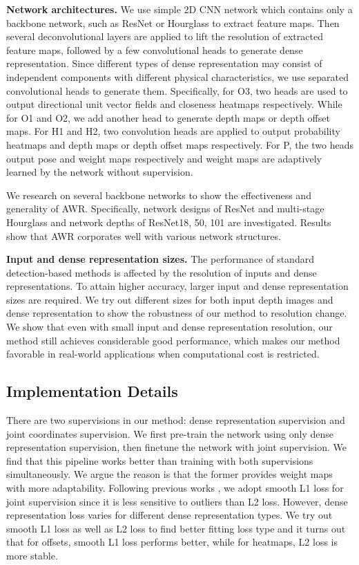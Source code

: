 \documentclass[letterpaper]{article} \usepackage{aaai20}  \usepackage{times}  \usepackage{helvet} \usepackage{courier}  \usepackage[hyphens]{url}  \usepackage{graphicx} \usepackage{amsmath}
\begin{document}
\parskip=0pt

\textbf{Network architectures.} We use simple 2D CNN network which contains only a backbone network, such as ResNet\cite{resnet} or Hourglass\cite{hourglass} to extract feature maps. Then several deconvolutional layers are applied to lift the resolution of extracted feature maps, followed by a few convolutional heads to generate dense representation. Since different types of dense representation may consist of independent components with different physical characteristics, we use separated convolutional heads to generate them. Specifically, for O3, two heads are used to output directional unit vector fields and closeness heatmaps respectively. While for O1 and O2, we add another head to generate depth maps or depth offset maps. For H1 and H2, two convolution heads are applied to output probability heatmaps and depth maps or depth offset maps respectively. For P, the two heads output pose and weight maps respectively and weight maps are adaptively learned by the network without supervision.

We research on several backbone networks to show the effectiveness and generality of AWR. Specifically, network designs of ResNet \cite{resnet} and multi-stage Hourglass \cite{hourglass} and network depths of ResNet18, 50, 101 are investigated. Results show that AWR corporates well with various network structures.

\parskip=0pt

\textbf{Input and dense representation sizes.} The performance of standard detection-based methods is affected by the resolution of inputs and dense representations. To attain higher accuracy, larger input and dense representation sizes are required. We try out different sizes for both input depth images and dense representation to show the robustness of our method to resolution change. We show that even with small input and dense representation resolution, our method still achieves considerable good performance, which makes our method favorable in real-world applications when computational cost is restricted. 

\parskip=0pt

\subsection{Implementation Details}

There are two supervisions in our method: dense representation supervision and joint coordinates supervision. We first pre-train the network using only dense representation supervision, then finetune the network with joint supervision. We find that this pipeline works better than training with both supervisions simultaneously. We argue the reason is that the former provides weight maps with more adaptability. Following previous works \cite{srn}, we adopt smooth L1 loss for joint supervision since it is less sensitive to outliers than L2 loss. However, dense representation loss varies for different dense representation types. We try out smooth L1 loss as well as L2 loss to find better fitting loss type and it turns out that for offsets, smooth L1 loss performs better, while for heatmaps, L2 loss is more stable. 
\end{document}
